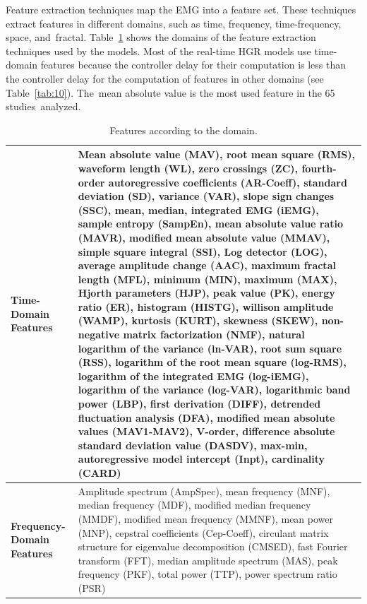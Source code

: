 \documentclass[sensors,review,accept,moreauthors,pdftex]{Definitions/mdpi}
\begin{document}
Feature extraction techniques map the EMG into a feature set. These techniques extract features in different domains, such as time, frequency, time-frequency, space, and~fractal. Table~\ref{tab:10a} shows the domains of the feature extraction techniques used by the models. Most of the real-time HGR models use time-domain features because the controller delay for their computation is less than the controller delay for the computation of features in other domains (see Table~\ref{tab:10}). The~mean absolute value is the most used feature in the 65 studies~analyzed.
	
	

\begin{table}[H]
	\caption{Features according to the domain.}
	\label{tab:10a}
	\centering
	\setlength{\tabcolsep}{3pt}
	\begin{tabular}{m{105pt}m{320pt}}
	
		\toprule
		
		\textbf{Time-Domain Features}& Mean absolute value (MAV),	root mean square (RMS), waveform length (WL), zero crossings (ZC), fourth-order autoregressive coefficients (AR-Coeff), 	standard deviation (SD), variance (VAR), slope sign changes (SSC), mean, median, integrated EMG (iEMG), sample entropy (SampEn), mean absolute value ratio (MAVR), modified mean absolute value (MMAV), simple square integral (SSI), Log detector (LOG), average amplitude change (AAC), maximum fractal length (MFL), minimum (MIN), maximum (MAX), Hjorth parameters (HJP), peak value (PK), energy ratio (ER), histogram (HISTG), willison amplitude (WAMP), kurtosis (KURT), skewness (SKEW), non-negative matrix factorization (NMF), natural logarithm of the variance (ln-VAR), root sum square (RSS), logarithm of the root mean square (log-RMS), logarithm  of the integrated EMG (log-iEMG),  logarithm of the variance (log-VAR), logarithmic band power (LBP), first derivation (DIFF),  detrended fluctuation analysis (DFA), modified mean absolute values (MAV1-MAV2), V-order, difference absolute standard deviation value (DASDV), max-min, autoregressive model intercept (Inpt), cardinality (CARD)   \\
		\midrule
		
		\textbf{Frequency-Domain Features}&
		
		Amplitude spectrum (AmpSpec), mean frequency (MNF), median frequency (MDF), modified median frequency (MMDF), modified mean frequency (MMNF), mean power (MNP), cepstral coefficients (Cep-Coeff), circulant matrix structure for eigenvalue decomposition (CMSED), fast Fourier transform (FFT), median amplitude spectrum (MAS), peak frequency (PKF), total power (TTP), power spectrum ratio (PSR)  \\
		\midrule
		

\end{tabular}
\end{table}
\end{document}
